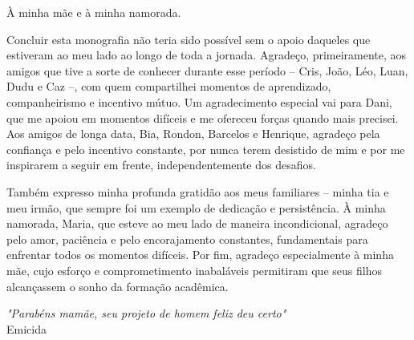\documentclass[embeddedlogo, nohidelinks, arial]{ufsc-thesis-rn46-2019}
\theoremstyle{definition}
\begin{document}

\pretextual%
\imprimircapa%
\imprimirfolhaderosto*
\protect{}
\imprimirfolhadecertificacao

\begin{dedicatoria}
À minha mãe e à minha namorada.
\end{dedicatoria}

\begin{agradecimentos}
  Concluir esta monografia não teria sido possível sem o apoio daqueles que estiveram ao meu lado ao longo de toda a jornada. Agradeço, primeiramente, aos amigos que tive a sorte de conhecer durante esse período – Cris, João, Léo, Luan, Dudu e Caz –, com quem compartilhei momentos de aprendizado, companheirismo e incentivo mútuo. Um agradecimento especial vai para Dani, que me apoiou em momentos difíceis e me ofereceu forças quando mais precisei. Aos amigos de longa data, Bia, Rondon, Barcelos e Henrique, agradeço pela confiança e pelo incentivo constante, por nunca terem desistido de mim e por me inspirarem a seguir em frente, independentemente dos desafios.

  Também expresso minha profunda gratidão aos meus familiares – minha tia e meu irmão, que sempre foi um exemplo de dedicação e persistência. À minha namorada, Maria, que esteve ao meu lado de maneira incondicional, agradeço pelo amor, paciência e pelo encorajamento constantes, fundamentais para enfrentar todos os momentos difíceis. Por fim, agradeço especialmente à minha mãe, cujo esforço e comprometimento inabaláveis permitiram que seus filhos alcançassem o sonho da formação acadêmica.
\end{agradecimentos}

\begin{epigrafe}
\textit{"Parabéns mamãe, seu projeto de homem feliz deu certo"} \\ Emicida
\end{epigrafe}
\end{document}
